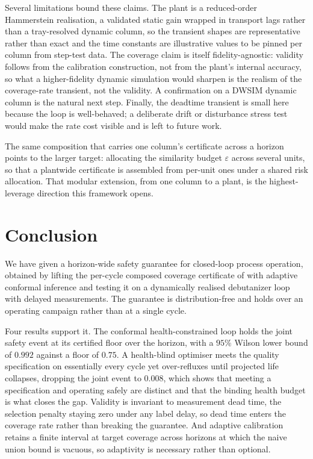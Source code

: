 \documentclass[review,12pt]{elsarticle}
\begin{document}
Several limitations bound these claims. The plant is a reduced-order Hammerstein realisation, a
validated static gain wrapped in transport lags rather than a tray-resolved dynamic column, so
the transient shapes are representative rather than exact and the time constants are
illustrative values to be pinned per column from step-test data. The coverage claim is itself
fidelity-agnostic: validity follows from the calibration construction, not from the plant's
internal accuracy, so what a higher-fidelity dynamic simulation would sharpen is the realism of
the coverage-rate transient, not the validity. A confirmation on a DWSIM dynamic column is the
natural next step. Finally, the deadtime transient is small here because the loop is
well-behaved; a deliberate drift or disturbance stress test would make the rate cost visible and
is left to future work.

The same composition that carries one column's certificate across a horizon points to the larger
target: allocating the similarity budget $\varepsilon$ across several units, so that a plantwide
certificate is assembled from per-unit ones under a shared risk allocation. That modular
extension, from one column to a plant, is the highest-leverage direction this framework opens.
\section{Conclusion}
\label{sec:conclusion}

We have given a horizon-wide safety guarantee for closed-loop process operation, obtained by
lifting the per-cycle composed coverage certificate of \citet{busico_m4} with adaptive conformal
inference \citep{gibbs2021} and testing it on a dynamically realised debutanizer loop with
delayed measurements. The guarantee is distribution-free and holds over an operating campaign
rather than at a single cycle.

Four results support it. The conformal health-constrained loop holds the joint safety event at
its certified floor over the horizon, with a $95\%$ Wilson lower bound of $0.992$ against a floor
of $0.75$. A health-blind optimiser meets the quality specification on essentially every cycle
yet over-refluxes until projected life collapses, dropping the joint event to $0.008$, which
shows that meeting a specification and operating safely are distinct and that the binding health
budget is what closes the gap. Validity is invariant to measurement dead time, the selection
penalty staying zero under any label delay, so dead time enters the coverage rate rather than
breaking the guarantee. And adaptive calibration retains a finite interval at target coverage
across horizons at which the naive union bound is vacuous, so adaptivity is necessary rather than
optional.
\end{document}
